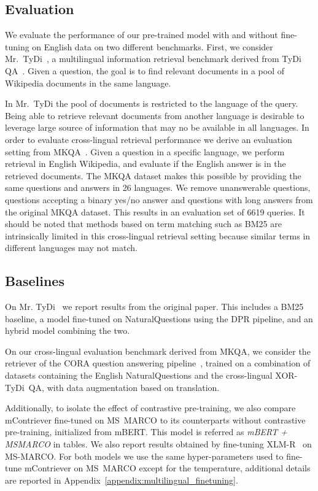\documentclass[10pt]{article} %
\def \oursmulti          {mContriever}
\begin{document}
\subsection{Evaluation}\label{sec:multilingual_eval}
We evaluate the performance of our pre-trained model with and without fine-tuning on English data on two different benchmarks.
First, we consider Mr.~TyDi~\citep{zhang2021mrtydi}, a multilingual information retrieval benchmark derived from TyDi {QA}~\citep{clark2020tydiqa}. 
Given a question, the goal is to find relevant documents in a pool of Wikipedia documents in the same language.

In Mr.~TyDi the pool of documents is restricted to the language of the query. 
Being able to retrieve relevant documents from another language is desirable to leverage large source of information that may no be available in all languages.
In order to evaluate cross-lingual retrieval performance we derive an evaluation setting from MKQA~\citep{longpre2020mkqa}.
Given a question in a specific language, we perform retrieval in English Wikipedia, and evaluate if the English answer is in the retrieved documents. 
The MKQA dataset makes this possible by providing the same questions and answers in 26 languages.
We remove unanswerable questions, questions accepting a binary yes/no answer and questions with long answers from the original MKQA dataset. This results in an evaluation set of 6619 queries.
It should be noted that methods based on term matching such as BM25 are intrinsically limited in this cross-lingual retrieval setting because similar terms in different languages may not match.

\subsection{Baselines}
On Mr. TyDi~\citep{zhang2021mrtydi} we report results from the original paper. This includes a BM25 baseline, a model fine-tuned on NaturalQuestions using the DPR pipeline, and an hybrid model combining the two.

On our cross-lingual evaluation benchmark derived from MKQA, we consider the retriever of the CORA question answering pipeline~\citep{asai2021cora}, trained on a combination of datasets containing the English NaturalQuestions and the cross-lingual XOR-TyDi~QA, with data augmentation based on translation.

Additionally, to isolate the effect of contrastive pre-training, we also compare \oursmulti{} fine-tuned on MS~MARCO to its counterparts without contrastive pre-training, initialized from mBERT.
This model is referred as \textit{mBERT + MSMARCO} in tables.
We also report results obtained by fine-tuning XLM-R~\citep{conneau2020xlmr} on MS-MARCO.
For both models we use the same hyper-parameters used to fine-tune mContriever on MS~MARCO except for the temperature, additional details are reported in Appendix~\ref{appendix:multilingual_finetuning}.
\end{document}

